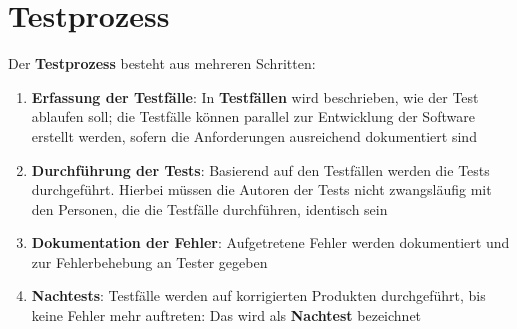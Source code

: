 \section{Testprozess}
Der \textbf{Testprozess} besteht aus mehreren Schritten:

\begin{enumerate}
    \item \textbf{Erfassung der Testfälle}: In \textbf{Testfällen} wird beschrieben, wie der Test ablaufen soll; die Testfälle können parallel zur Entwicklung der Software erstellt werden, sofern die Anforderungen ausreichend dokumentiert sind
    \item \textbf{Durchführung der Tests}: Basierend auf den Testfällen werden die Tests durchgeführt. Hierbei müssen die Autoren der Tests nicht zwangsläufig mit den Personen, die die Testfälle durchführen, identisch sein
    \item \textbf{Dokumentation der Fehler}: Aufgetretene Fehler werden dokumentiert und zur Fehlerbehebung an Tester gegeben
    \item \textbf{Nachtests}: Testfälle werden auf korrigierten Produkten durchgeführt, bis keine Fehler mehr auftreten: Das wird als \textbf{Nachtest} bezeichnet
\end{enumerate}